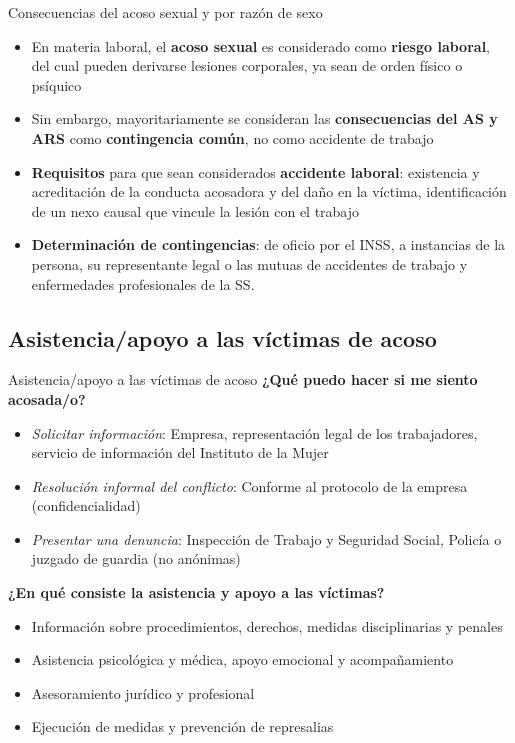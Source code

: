 \documentclass{beamer}
\begin{document}
    \begin{frame}{Consecuencias del acoso sexual y por razón de sexo}
        \begin{itemize}
            \item En materia laboral, el \textbf{acoso sexual} es considerado como \textbf{riesgo laboral}, del cual pueden derivarse lesiones corporales, ya sean de orden físico o psíquico
            \item Sin embargo, mayoritariamente se consideran las \textbf{consecuencias del AS y ARS} como \textbf{contingencia común}, no como accidente de trabajo
            \item \textbf{Requisitos} para que sean considerados \textbf{accidente laboral}: existencia y acreditación de la conducta acosadora y del daño en la víctima, identificación de un nexo causal que vincule la lesión con el trabajo
            \item \textbf{Determinación de contingencias}: de oficio por el INSS, a instancias de la persona, su representante legal o las mutuas de accidentes de trabajo y enfermedades profesionales de la SS.
        \end{itemize}
    \end{frame}

    \subsection{Asistencia/apoyo a las víctimas de acoso}
    \begin{frame}{Asistencia/apoyo a las víctimas de acoso}
        \textbf{¿Qué puedo hacer si me siento acosada/o?}
        \begin{itemize}
            \item \textit{Solicitar información}: Empresa, representación legal de los trabajadores, servicio de información del Instituto de la Mujer
            \item \textit{Resolución informal del conflicto}: Conforme al protocolo de la empresa (confidencialidad)
            \item \textit{Presentar una denuncia}: Inspección de Trabajo y Seguridad Social, Policía o juzgado de guardia (no anónimas)
        \end{itemize}
        \textbf{¿En qué consiste la asistencia y apoyo a las víctimas?}
        \begin{itemize}
            \item Información sobre procedimientos, derechos, medidas disciplinarias y penales
            \item Asistencia psicológica y médica, apoyo emocional y acompañamiento
            \item Asesoramiento jurídico y profesional
            \item Ejecución de medidas y prevención de represalias
        \end{itemize}
    \end{frame}
\end{document}
